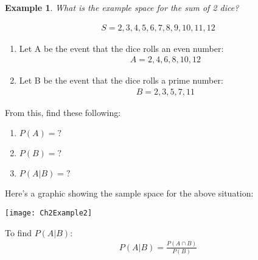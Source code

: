 \documentclass[../IND E 315.tex]{subfiles}
\newtheorem{exmp}{Example}
\begin{document}
\begin{exmp}
    What is the example space for the sum of 2 dice?
\end{exmp}
\begin{equation*}
    \begin{aligned}
        S = {2,3,4,5,6,7,8,9,10,11,12}
    \end{aligned}
\end{equation*}
\begin{enumerate}
    \item Let A be the event that the dice rolls an even number:
        \begin{equation*}
            \begin{aligned}
                A = {2,4,6,8,10,12}
            \end{aligned}
        \end{equation*}
    \item Let B be the event that the dice rolls a prime number:
        \begin{equation*}
            \begin{aligned}
                B = {2,3,5,7,11}
            \end{aligned}
        \end{equation*}
\end{enumerate}
From this, find these following:
\begin{enumerate}
    \item $P(A) = ?$
    \item $P(B) = ?$ 
    \item $P(A|B) = ?$
\end{enumerate}

Here's a graphic showing the sample space for the above situation:
\begin{center}
    \texttt{[image: Ch2Example2]}
\end{center}
To find $P(A|B)$:
\begin{equation*}
    \begin{aligned}
        P(A|B) = \frac{P(A \cap B)}{P(B)}
    \end{aligned}
\end{equation*}
\end{document}
